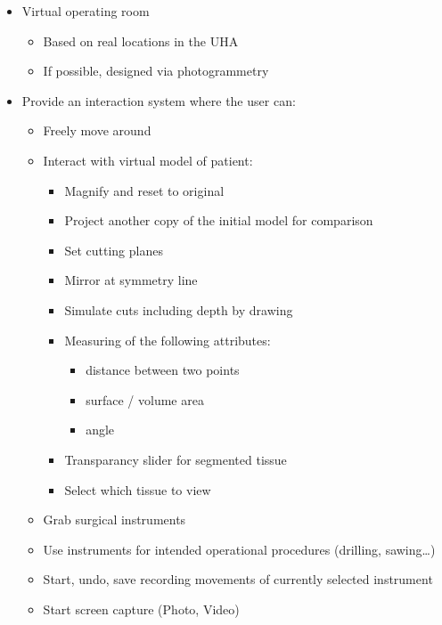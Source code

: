 \begin{itemize}
    \item Virtual operating room
        \begin{itemize}
            \item Based on real locations in the UHA
            \item If possible, designed via photogrammetry
        \end{itemize}
    \item Provide an interaction system where the user can:
        \begin{itemize}
            \item Freely move around
            \item Interact with virtual model of patient:
                \begin{itemize}
                    \item Magnify and reset to original
                    \item Project another copy of the initial model for comparison
                    \item Set cutting planes
                    \item Mirror at symmetry line
                    \item Simulate cuts including depth by drawing
                    \item Measuring of the following attributes:
                        \begin{itemize}
                            \item distance between two points
                            \item surface / volume area
                            \item angle
                        \end{itemize}
                    \item Transparancy slider for segmented tissue
                    \item Select which tissue to view
                \end{itemize}
            \item Grab surgical instruments
            \item Use instruments for intended operational procedures (drilling, sawing\dots)
            \item Start, undo, save recording movements of currently selected instrument 
            \item Start screen capture (Photo, Video)

\end{itemize}
\end{itemize}
